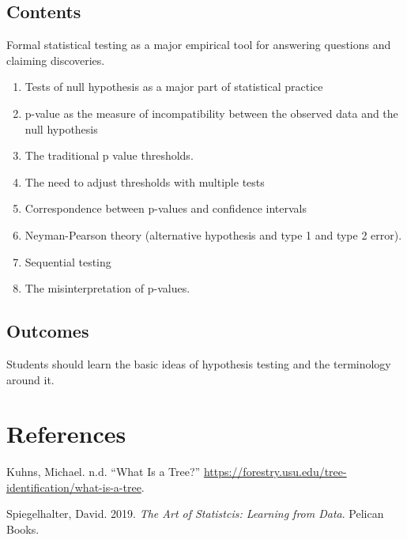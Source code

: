 \documentclass[
  letterpaper,
]{scrbook}
\providecommand{\tightlist}{%
  \setlength{\itemsep}{0pt}\setlength{\parskip}{0pt}}\usepackage{longtable,booktabs,array}
\newlength{\cslhangindent}
\newlength{\cslentryspacingunit} %
\newenvironment{CSLReferences}[2] %
 {%
  \setlength{\parindent}{0pt}
  \ifodd #1
  \let\oldpar\par
  \def\par{\hangindent=\cslhangindent\oldpar}
  \fi
  \setlength{\parskip}{#2\cslentryspacingunit}
 }%
 {}
\begin{document}
\hypertarget{contents-9}{%
\section{Contents}\label{contents-9}}

Formal statistical testing as a major empirical tool for answering
questions and claiming discoveries.

\begin{enumerate}
\def\labelenumi{\arabic{enumi}.}
\tightlist
\item
  Tests of null hypothesis as a major part of statistical practice
\item
  p-value as the measure of incompatibility between the observed data
  and the null hypothesis
\item
  The traditional p value thresholds.
\item
  The need to adjust thresholds with multiple tests
\item
  Correspondence between p-values and confidence intervals
\item
  Neyman-Pearson theory (alternative hypothesis and type 1 and type 2
  error).
\item
  Sequential testing
\item
  The misinterpretation of p-values.
\end{enumerate}

\hypertarget{outcomes}{%
\section{Outcomes}\label{outcomes}}

Students should learn the basic ideas of hypothesis testing and the
terminology around it.


\hypertarget{references}{%
\chapter*{References}\label{references}}

\hypertarget{refs}{}
\begin{CSLReferences}{1}{0}
\leavevmode{}%
Kuhns, Michael. n.d. {``What Is a Tree?''}
\url{https://forestry.usu.edu/tree-identification/what-is-a-tree}.

\leavevmode{}%
Spiegelhalter, David. 2019. \emph{The Art of Statistcis: Learning from
Data}. Pelican Books.

\end{CSLReferences}


\backmatter
\end{document}
